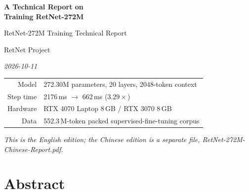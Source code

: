 \thispagestyle{empty}

\begin{center}
\vspace*{3.2cm}

{\LARGE\bfseries A Technical Report on\\[0.25em] Training RetNet-272M}

\vspace{0.55cm}

{\large RetNet-272M Training Technical Report}

\vspace{1.1cm}

{\normalsize RetNet Project}

\vspace{0.25cm}

{\small\itshape 2026-10-11}

\vspace{2.2cm}

\begin{minipage}{0.80\textwidth}
\centering\small
\begin{tabular}{@{}rl@{}}
\toprule
Model & 272.30M parameters, 20 layers, 2048-token context \\
Step time & 2176\,ms $\rightarrow$ 662\,ms ($3.29\times$) \\
Hardware & RTX 4070 Laptop 8\,GB / RTX 3070 8\,GB \\
Data & 552.3\,M-token packed supervised-fine-tuning corpus \\
\bottomrule
\end{tabular}
\end{minipage}

\vfill

{\small\itshape This is the English edition; the Chinese edition is a separate file,
RetNet-272M-Chinese-Report.pdf.}

\vspace{1.2cm}
\end{center}

\clearpage

\section*{Abstract}

